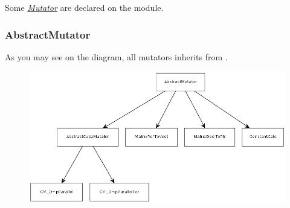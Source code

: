 \documentclass[a4paper,10pt,english]{manual}
\begin{document}
Some \hyperlink{term-mutator}{\emph{Mutator}} are declared on the  module.


\subsubsection{AbstractMutator}

As you may see on the diagram, all mutators inherits from .
\begin{figure}[htbp]
\centering

\includegraphics{mutator_inheritance.png}
\end{figure}
\hypertarget{module-Backends.Common.Mutators.AbstractMutator}{}
\modulesynopsis{}
\end{document}
